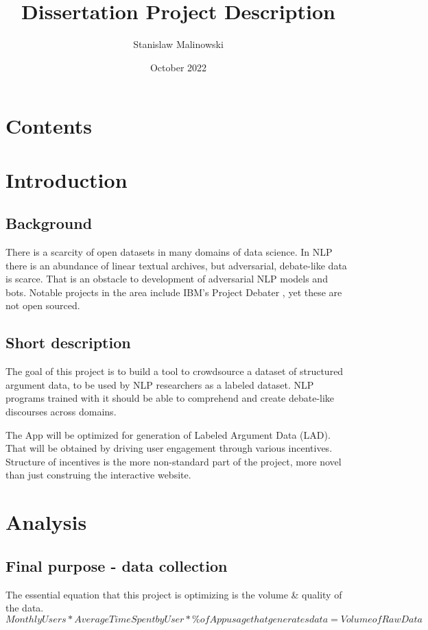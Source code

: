 \documentclass{article}
\title{Dissertation Project Description}
\author{Stanislaw Malinowski}
\date{October 2022}
\begin{document}
\maketitle
\section*{Contents}
\tableofcontents
\newpage

\section{Introduction}

\subsection*{Background}
There is a scarcity of open datasets in many domains of data science. In NLP there is an abundance of linear textual archives, but adversarial, debate-like data is scarce.
That is an obstacle to development of adversarial NLP models and bots. Notable projects in the area include IBM's Project Debater \cite[]{https://research.ibm.com/interactive/project-debater/}, yet these are not open sourced.

\subsection*{Short description}
The goal of this project is to build a tool to crowdsource a dataset of structured argument data, to be used by NLP researchers as a labeled dataset.
NLP programs trained with it should be able to comprehend and create debate-like discourses across domains.

The App will be optimized for generation of Labeled Argument Data (LAD).
That will be obtained by driving user engagement through various incentives. 
Structure of incentives is the more non-standard part of the project, more novel than just construing the interactive website.

\section{Analysis}
\subsection[]{Final purpose - data collection}
The essential equation that this project is optimizing is the volume & quality of the data.
\begin{equation}
  {Monthly Users} * {Average Time Spent by User} * {\% of App usage that generates data} = {Volume of Raw Data}
\end{equation}
\end{document}
